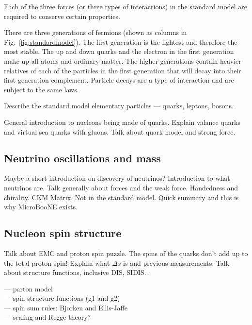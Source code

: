   Each of the three forces (or three types of interactions) in the standard
  model are required to conserve certain properties.

  There are three generations of fermions (shown as columns in
  Fig.~\ref{fig:standardmodel}). The first generation is the lightest and
  therefore the most stable. The up and down quarks and the electron in the
  first generation make up all atoms and ordinary matter. The higher
  generations contain heavier relatives of each of the particles in the first
  generation that will decay into their first generation complement. Particle
  decays are a type of interaction and are subject to the same laws.


  Describe the standard model elementary particles --- quarks, leptons, bosons.

  General introduction to nucleons being made of quarks. Explain valance quarks
  and virtual sea quarks with gluons.  Talk about quark model and strong force.


\subsection{Neutrino oscillations and mass}\label{sec:bsm}
    Maybe a short introduction on discovery of neutrinos?
    Introduction to what neutrinos are. Talk generally about forces and the
    weak force.  Handedness and chirality. CKM Matrix.
  Not in the standard model. Quick summary and this is why MicroBooNE exists.

\subsection{Nucleon spin structure}\label{sec:nucleonbsm}
  Talk about EMC and proton spin puzzle. The spins of the quarks don't add up
  to the total proton spin! Explain what $\Delta s$ is and previous
  measurements. Talk about structure functions, inclusive DIS, SIDIS...

  --- parton model \\
  --- spin structure functions (g1 and g2) \\
  --- spin sum rules: Bjorken and Ellis-Jaffe \\

  --- scaling and Regge theory?

